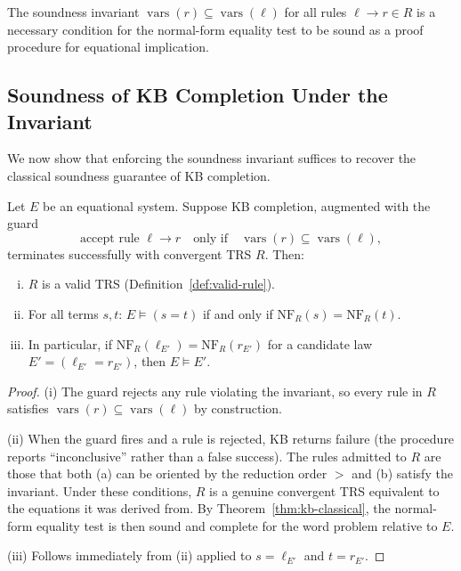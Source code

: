 \begin{corollary}\label{cor:invariant-necessary}
The soundness invariant $\operatorname{vars}(r) \subseteq \operatorname{vars}(\ell)$ for all rules
$\ell \to r \in R$ is a necessary condition for the normal-form equality test to
be sound as a proof procedure for equational implication.
\end{corollary}

\subsection{Soundness of KB Completion Under the Invariant}

We now show that enforcing the soundness invariant suffices to recover the classical
soundness guarantee of KB completion.

\begin{theorem}\label{thm:kb-soundness}
Let $E$ be an equational system.  Suppose KB completion, augmented with the guard
\[
  \text{accept rule } \ell \to r
  \quad\text{only if}\quad
  \operatorname{vars}(r) \subseteq \operatorname{vars}(\ell),
\]
terminates successfully with convergent TRS $R$.  Then:
\begin{enumerate}[(i)]
  \item $R$ is a valid TRS (Definition~\ref{def:valid-rule}).
  \item For all terms $s, t$: $E \models (s = t)$ if and only if
        $\mathrm{NF}_R(s) = \mathrm{NF}_R(t)$.
  \item In particular, if $\mathrm{NF}_R(\ell_{E'}) = \mathrm{NF}_R(r_{E'})$ for a
        candidate law $E' = (\ell_{E'} = r_{E'})$, then $E \models E'$.
\end{enumerate}
\end{theorem}

\begin{proof}
(i) The guard rejects any rule violating the invariant, so every rule in $R$
satisfies $\operatorname{vars}(r) \subseteq \operatorname{vars}(\ell)$ by construction.

(ii) When the guard fires and a rule is rejected, KB returns failure (the procedure
reports ``inconclusive'' rather than a false success).  The rules admitted to $R$
are those that both (a) can be oriented by the reduction order $>$ and (b) satisfy
the invariant.  Under these conditions, $R$ is a genuine convergent TRS equivalent
to the equations it was derived from.  By Theorem~\ref{thm:kb-classical}, the
normal-form equality test is then sound and complete for the word problem relative
to $E$.

(iii) Follows immediately from (ii) applied to $s = \ell_{E'}$ and $t = r_{E'}$.
\end{proof}

